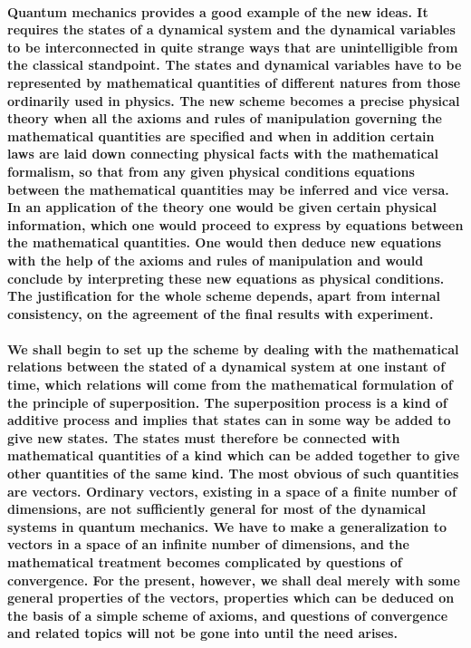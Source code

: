 \documentclass[10pt, kindle, oneside]{kindle}
\begin{document}
\paragraph{Quantum mechanics provides a good example of the new ideas. It requires the states of a dynamical system and the dynamical variables to be interconnected in quite strange ways that are unintelligible from the classical standpoint. The states and dynamical variables have to be represented by mathematical quantities of different natures from those ordinarily used in physics. The new scheme becomes a precise physical theory when all the axioms and rules of manipulation governing the mathematical quantities are specified and when in addition certain laws are laid down connecting physical facts with the mathematical formalism, so that from any given physical conditions equations between the mathematical quantities may be inferred and vice versa. In an application of the theory one would be given certain physical information, which one would proceed to express by equations between the mathematical quantities. One would then deduce new equations with the help of the axioms and rules of manipulation and would conclude by interpreting these new equations as physical conditions. The justification for the whole scheme depends, apart from internal consistency, on the agreement of the final results with experiment.}
\paragraph{We shall begin to set up the scheme by dealing with the mathematical relations between the stated of a dynamical system at one instant of time, which relations will come from the mathematical formulation of the principle of superposition. The superposition process is a kind of additive process and implies that states can in some way be added to give new states. The states must therefore be connected with mathematical quantities of a kind which can be added together to give other quantities of the same kind. The most obvious of such quantities are vectors. Ordinary vectors, existing in a space of a finite number of dimensions, are not sufficiently general for most of the dynamical systems in quantum mechanics. We have to make a generalization to vectors in a space of an infinite number of dimensions, and the mathematical treatment becomes complicated by questions of convergence. For the present, however, we shall deal merely with some general properties of the vectors, properties which can be deduced on the basis of a simple scheme of axioms, and questions of convergence and related topics will not be gone into until the need arises.}
\end{document}
